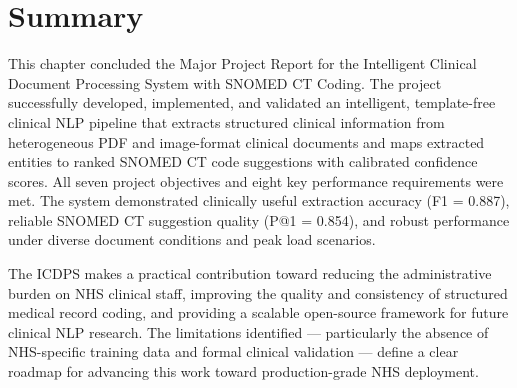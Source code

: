 \section*{Summary}

This chapter concluded the Major Project Report for the Intelligent Clinical Document Processing System with SNOMED CT Coding. The project successfully developed, implemented, and validated an intelligent, template-free clinical NLP pipeline that extracts structured clinical information from heterogeneous PDF and image-format clinical documents and maps extracted entities to ranked SNOMED CT code suggestions with calibrated confidence scores. All seven project objectives and eight key performance requirements were met. The system demonstrated clinically useful extraction accuracy (F1 = 0.887), reliable SNOMED CT suggestion quality (P@1 = 0.854), and robust performance under diverse document conditions and peak load scenarios.

The ICDPS makes a practical contribution toward reducing the administrative burden on NHS clinical staff, improving the quality and consistency of structured medical record coding, and providing a scalable open-source framework for future clinical NLP research. The limitations identified --- particularly the absence of NHS-specific training data and formal clinical validation --- define a clear roadmap for advancing this work toward production-grade NHS deployment.